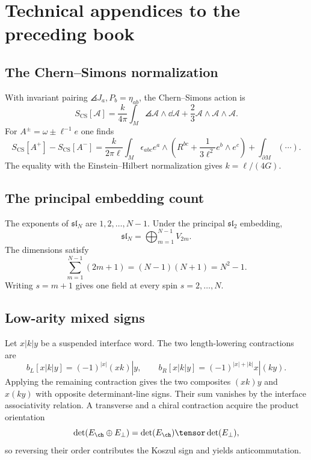 \part{Technical appendices to the preceding book}
\chapter{The Chern--Simons normalization}
With invariant pairing $\angles{J_a,P_b}=\eta_{ab}$, the Chern--Simons action is
\[
 S_{\mathrm{CS}}[\mathcal A]
 =\frac{k}{4\pi}\int_M
 \angles{\mathcal A\wedge\dd\mathcal A
 +\frac23\mathcal A\wedge\mathcal A\wedge\mathcal A}.
\]
For $A^\pm=\omega\pm\ell^{-1}e$ one finds
\[
 S_{\mathrm{CS}}[A^+]-S_{\mathrm{CS}}[A^-]
 =\frac{k}{2\pi\ell}\int_M
 \epsilon_{abc}e^a\wedge
 \left(R^{bc}+\frac1{3\ell^2}e^b\wedge e^c\right)
 +\int_{\partial M}(\cdots).
\]
The equality with the Einstein--Hilbert normalization gives $k=\ell/(4G)$.

\chapter{The principal embedding count}
The exponents of $\mathfrak{sl}_N$ are $1,2,\ldots,N-1$.  Under the principal $\mathfrak{sl}_2$ embedding,
\[
 \mathfrak{sl}_N=\bigoplus_{m=1}^{N-1}V_{2m}.
\]
The dimensions satisfy
\[
 \sum_{m=1}^{N-1}(2m+1)
 =(N-1)(N+1)=N^2-1.
\]
Writing $s=m+1$ gives one field at every spin $s=2,\ldots,N$.

\chapter{Low-arity mixed signs}
Let $x|k|y$ be a suspended interface word.  The two length-lowering contractions are
\[
 b_L[x|k|y]=(-1)^{|x|}(xk)|y,
 \qquad
 b_R[x|k|y]=(-1)^{|x|+|k|}x|(ky).
\]
Applying the remaining contraction gives the two composites $(xk)y$ and $x(ky)$ with opposite determinant-line signs.  Their sum vanishes by the interface associativity relation.  A transverse and a chiral contraction acquire the product orientation
\[
 \det(E_{\ch}\oplus E_\perp)
 =\det(E_{\ch})\tensor\det(E_\perp),
\]
so reversing their order contributes the Koszul sign and yields anticommutation.
